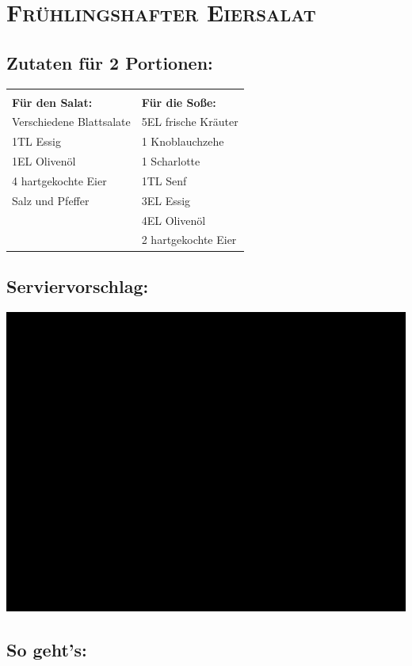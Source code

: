 \section{\textsc{Frühlingshafter Eiersalat}}

\subsection*{Zutaten für 2 Portionen:}

\begin{tabular}{p{7.5cm} p{7.5cm}}
	& \\
	\textbf{Für den Salat:} & \textbf{Für die Soße:} \\
	Verschiedene Blattsalate & 5EL frische Kräuter \\
	1TL Essig & 1 Knoblauchzehe \\
	1EL Olivenöl & 1 Scharlotte \\
	4 hartgekochte Eier & 1TL Senf \\
	Salz und Pfeffer & 3EL Essig \\
	& 4EL Olivenöl \\
  & 2 hartgekochte Eier
\end{tabular}

\subsection*{Serviervorschlag:}

\includegraphics[width=\textwidth]{img/ph.jpg} \cite{fruehlingeiersalat}

\subsection*{So geht's:}

